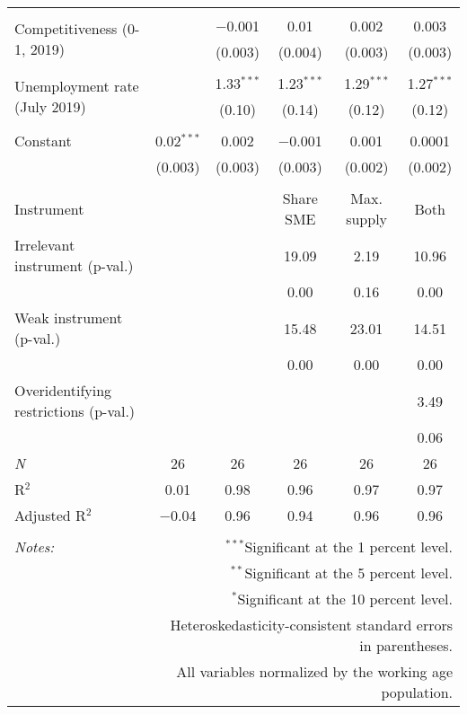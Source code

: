 \begin{table}[!htbp]
\begin{tabular}{@{\extracolsep{5pt}}lccccc}
  & & & & & \\ 
 \multirow{2}{4cm}{Competitiveness (0-1, 2019)} &  & $-$0.001 & 0.01 & 0.002 & 0.003 \\ 
  &  & (0.003) & (0.004) & (0.003) & (0.003) \\ 
  & & & & & \\ 
 \multirow{2}{4cm}{Unemployment rate (July 2019)} &  & 1.33$^{***}$ & 1.23$^{***}$ & 1.29$^{***}$ & 1.27$^{***}$ \\ 
  &  & (0.10) & (0.14) & (0.12) & (0.12) \\ 
  & & & & & \\ 
 Constant & 0.02$^{***}$ & 0.002 & $-$0.001 & 0.001 & 0.0001 \\ 
  & (0.003) & (0.003) & (0.003) & (0.002) & (0.002) \\ 
  & & & & & \\ 
Instrument &  &  & Share SME & Max. supply & Both \\ 
{Irrelevant instrument (p-val.)} &  &  & 19.09 &  2.19 & 10.96 \\ 
 &  &  & 0.00 & 0.16 & 0.00 \\ 
{Weak instrument (p-val.)} &  &  & 15.48 & 23.01 & 14.51 \\ 
 &  &  & 0.00 & 0.00 & 0.00 \\ 
{Overidentifying restrictions (p-val.)} &  &  &  &  & 3.49 \\ 
 &  &  &  &  & 0.06 \\ 
\textit{N} & 26 & 26 & 26 & 26 & 26 \\ 
R$^{2}$ & 0.01 & 0.98 & 0.96 & 0.97 & 0.97 \\ 
Adjusted R$^{2}$ & $-$0.04 & 0.96 & 0.94 & 0.96 & 0.96 \\ 
\hline 
\hline \\[-1.8ex] 
\textit{Notes:} & \multicolumn{5}{r}{$^{***}$Significant at the 1 percent level.} \\ 
 & \multicolumn{5}{r}{$^{**}$Significant at the 5 percent level.} \\ 
 & \multicolumn{5}{r}{$^{*}$Significant at the 10 percent level.} \\ 
 & \multicolumn{5}{r}{Heteroskedasticity-consistent standard errors in parentheses.} \\ 
 & \multicolumn{5}{r}{All variables normalized by the working age population.} \\ 
\end{tabular} 
\end{table} 
